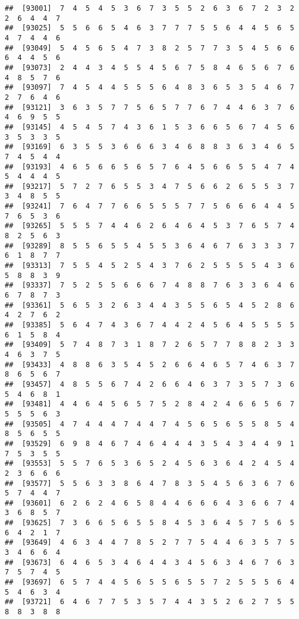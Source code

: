 \documentclass[
]{book}
\begin{document}
\begin{verbatim}
##  [93001]  7  4  5  4  5  3  6  7  3  5  5  2  6  3  6  7  2  3  2  2  6  4  4  7
##  [93025]  5  5  6  6  5  4  6  3  7  7  7  5  5  6  4  4  5  6  5  4  7  4  4  6
##  [93049]  5  4  5  6  5  4  7  3  8  2  5  7  7  3  5  4  5  6  6  6  4  4  5  6
##  [93073]  2  4  4  3  4  5  5  4  5  6  7  5  8  4  6  5  6  7  6  4  8  5  7  6
##  [93097]  7  4  5  4  4  5  5  5  6  4  8  3  6  5  3  5  4  6  7  2  7  6  4  6
##  [93121]  3  6  3  5  7  7  5  6  5  7  7  6  7  4  4  6  3  7  6  4  6  9  5  5
##  [93145]  4  5  4  5  7  4  3  6  1  5  3  6  6  5  6  7  4  5  6  3  5  3  3  5
##  [93169]  6  3  5  5  3  6  6  6  3  4  6  8  8  3  6  3  4  6  5  7  4  5  4  4
##  [93193]  4  6  5  6  6  5  6  5  7  6  4  5  6  6  5  5  4  7  4  5  4  4  4  5
##  [93217]  5  7  2  7  6  5  5  3  4  7  5  6  6  2  6  5  5  3  7  3  4  8  5  5
##  [93241]  7  6  4  7  7  6  6  5  5  5  7  7  5  6  6  6  4  4  5  7  6  5  3  6
##  [93265]  5  5  5  7  4  4  6  2  6  4  6  4  5  3  7  6  5  7  4  8  2  5  6  3
##  [93289]  8  5  5  6  5  5  4  5  5  3  6  4  6  7  6  3  3  3  7  6  1  8  7  7
##  [93313]  7  5  5  4  5  2  5  4  3  7  6  2  5  5  5  5  4  3  6  5  8  8  3  9
##  [93337]  7  5  2  5  5  6  6  6  7  4  8  8  7  6  3  3  6  4  6  6  7  8  7  3
##  [93361]  5  6  5  3  2  6  3  4  4  3  5  5  6  5  4  5  2  8  6  4  2  7  6  2
##  [93385]  5  6  4  7  4  3  6  7  4  4  2  4  5  6  4  5  5  5  5  6  1  5  8  4
##  [93409]  5  7  4  8  7  3  1  8  7  2  6  5  7  7  8  8  2  3  3  4  6  3  7  5
##  [93433]  4  8  8  6  3  5  4  5  2  6  6  4  6  5  7  4  6  3  7  8  6  5  6  7
##  [93457]  4  8  5  5  6  7  4  2  6  6  4  6  3  7  3  5  7  3  6  5  4  6  8  1
##  [93481]  4  4  6  4  5  6  5  7  5  2  8  4  2  4  6  6  5  6  7  5  5  5  6  3
##  [93505]  4  7  4  4  4  7  4  4  7  4  5  6  5  6  5  5  8  5  4  8  5  6  5  5
##  [93529]  6  9  8  4  6  7  4  6  4  4  4  3  5  4  3  4  4  9  1  7  5  3  5  5
##  [93553]  5  5  7  6  5  3  6  5  2  4  5  6  3  6  4  2  4  5  4  2  3  6  6  6
##  [93577]  5  5  6  3  3  8  6  4  7  8  3  5  4  5  6  3  6  7  6  5  7  4  4  7
##  [93601]  6  2  6  2  4  6  5  8  4  4  6  6  6  4  3  6  6  7  4  3  6  8  5  7
##  [93625]  7  3  6  6  5  6  5  5  8  4  5  3  6  4  5  7  5  6  5  6  4  2  1  7
##  [93649]  4  6  3  4  4  7  8  5  2  7  7  5  4  4  6  3  5  7  5  3  4  6  6  4
##  [93673]  6  4  6  5  3  4  6  4  4  3  4  5  6  3  4  6  7  6  3  7  5  7  4  5
##  [93697]  6  5  7  4  4  5  6  5  5  6  5  5  7  2  5  5  5  6  4  5  4  6  3  4
##  [93721]  6  4  6  7  7  5  3  5  7  4  4  3  5  2  6  2  7  5  5  8  8  3  8  8

\end{verbatim}
\end{document}

